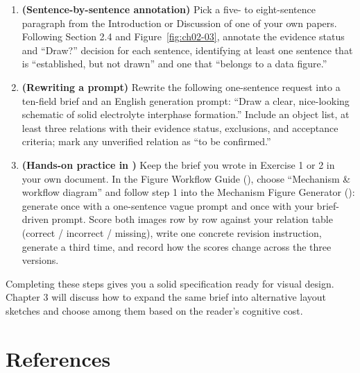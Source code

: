 \begin{enumerate}
\item \textbf{(Sentence-by-sentence annotation)} Pick a five- to eight-sentence paragraph from the Introduction or Discussion of one of your own papers. Following Section 2.4 and Figure~\ref{fig:ch02-03}, annotate the evidence status and ``Draw?'' decision for each sentence, identifying at least one sentence that is ``established, but not drawn'' and one that ``belongs to a data figure.''
\item \textbf{(Rewriting a prompt)} Rewrite the following one-sentence request into a ten-field brief and an English generation prompt: ``Draw a clear, nice-looking schematic of solid electrolyte interphase formation.'' Include an object list, at least three relations with their evidence status, exclusions, and acceptance criteria; mark any unverified relation as ``to be confirmed.''
\item \textbf{(Hands-on practice in \scidraw{})} Keep the brief you wrote in Exercise 1 or 2 in your own document. In the Figure Workflow Guide (), choose ``Mechanism \& workflow diagram'' and follow step 1 into the Mechanism Figure Generator (): generate once with a one-sentence vague prompt and once with your brief-driven prompt. Score both images row by row against your relation table (correct / incorrect / missing), write one concrete revision instruction, generate a third time, and record how the scores change across the three versions.
\end{enumerate}

Completing these steps gives you a solid specification ready for visual design. Chapter 3 will discuss how to expand the same brief into alternative layout sketches and choose among them based on the reader's cognitive cost.

\section*{References}

